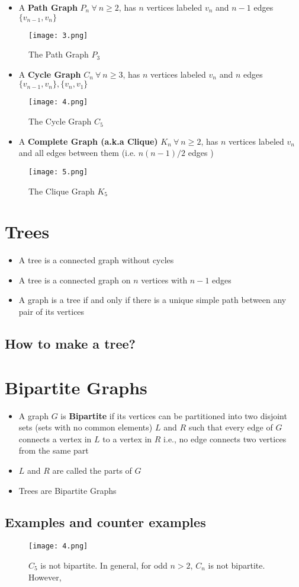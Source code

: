 \begin{itemize}
\item A \textbf{Path Graph} $P_{n} \ \forall \ n \geq 2$, has $n$ vertices labeled $v_{n}$ and $n-1$ edges $\{v_{n-1}, v_{n}\}$
\end{itemize}
\begin{figure}[h]\label{fig_3}
	\centering
	\texttt{[image: 3.png]}
	\caption{The Path Graph $P_{3}$}
\end{figure}
\begin{itemize}
\item A \textbf{Cycle Graph} $C_{n} \ \forall \ n \geq 3$, has $n$ vertices labeled $v_{n}$ and $n$ edges $\{v_{n-1}, v_{n}\},\{v_{n}, v_{1}\}$
\end{itemize}
\begin{figure}[h]\label{fig_4}
	\centering
	\texttt{[image: 4.png]}
	\caption{The Cycle Graph $C_{5}$}
\end{figure}
\pagebreak
\begin{itemize}
	\item A \textbf{Complete Graph (a.k.a Clique)} $K_{n} \ \forall \ n \geq 2$, has $n$ vertices labeled $v_{n}$ and all edges between them (i.e. $n(n-1)/2$ edges )
\end{itemize}
\begin{figure}[h]\label{fig_5}
	\centering
	\texttt{[image: 5.png]}
	\caption{The Clique Graph $K_{5}$}
\end{figure}
\section{Trees}
\begin{itemize}
\item A tree is a connected graph without cycles
\item A tree is a connected graph on $n$ vertices with $n - 1$ edges
\item A graph is a tree if and only if there is a unique simple path between any pair of its vertices
\end{itemize}
\subsection{How to make a tree?}
\section{Bipartite Graphs}
\begin{itemize}
\item A graph $G$ is \textbf{Bipartite} if its vertices can be partitioned into two disjoint sets (sets with no common elements) $L$ and $R$ such that every edge of $G$ connects a vertex in $L$ to a vertex in $R$  i.e., no edge connects two vertices from
the same part
\item $L$ and $R$ are called the parts of $G$
\item Trees are Bipartite Graphs
\end{itemize}
\subsection{Examples and counter examples}
\begin{figure}[h]\label{fig_2}
	\centering
	\texttt{[image: 4.png]}
	\caption{$C_{5}$ is not bipartite. In general, for odd $n > 2$, $C_{n}$ is not bipartite. However, }
\end{figure}
